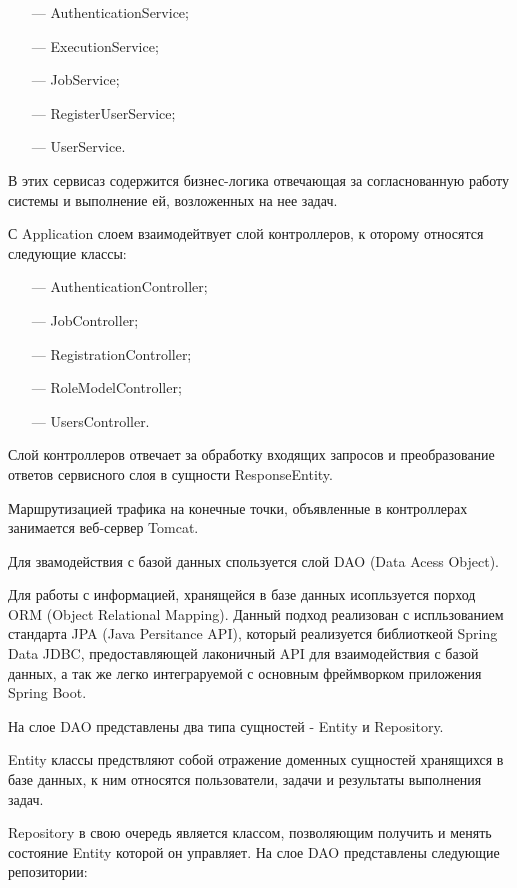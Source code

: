 \begin{itemize}
\item[---] AuthenticationService;
\item[---] ExecutionService;
\item[---] JobService;
\item[---] RegisterUserService;
\item[---] UserService.
\end{itemize}

В этих сервисаз содержится бизнес-логика отвечающая за согласнованную работу системы и выполнение ей, возложенных на нее задач.

С Application слоем взаимодейтвует слой контроллеров, к оторому относятся следующие классы:

\begin{itemize}
\item[---] AuthenticationController;
\item[---] JobController;
\item[---] RegistrationController;
\item[---] RoleModelController;
\item[---] UsersController.
\end{itemize}

Слой контроллеров отвечает за обработку входящих запросов и преобразование ответов сервисного слоя в сущности ResponseEntity.

Маршрутизацией трафика на конечные точки, объявленные в контроллерах занимается веб-сервер Tomcat.

Для звамодействия с базой данных спользуется слой DAO (Data Acess Object). 

Для работы с информацией, хранящейся в базе данных исопльзуется порход ORM (Object Relational Mapping)\cite{o2008object}. Данный подход реализован с испльзованием стандарта JPA (Java Persitance API)\cite{yang2010java}, который реализуется библиоткеой Spring Data JDBC, предоставляющей лаконичный API для взаимодействия с базой данных, а так же легко интеграруемой с основным фреймворком приложения Spring Boot.

На слое DAO представлены два типа сущностей - Entity и Repository.

Entity классы предствляют собой отражение доменных сущностей хранящихся в базе данных, к ним относятся пользователи, задачи и результаты выполнения задач. 

Repository в свою очередь является классом, позволяющим получить и менять состояние Entity которой он управляет. На слое DAO представлены следующие репозитории:

